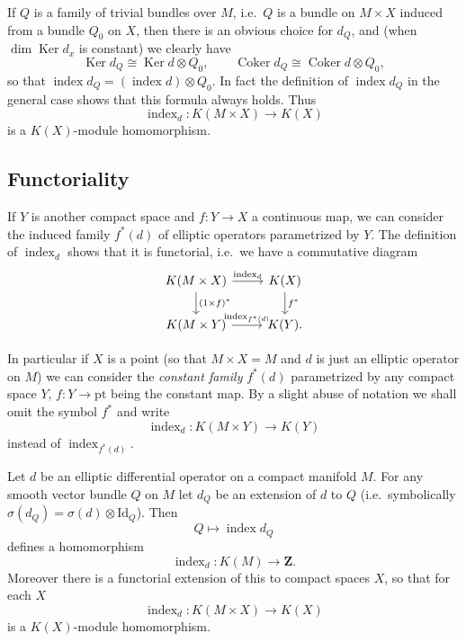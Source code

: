 \documentclass[12pt]{article}
\begin{document}
If $Q$ is a family of trivial bundles over $M$, i.e.\ $Q$ is a bundle on $M\times X$
induced from a bundle $Q_0$ on $X$, then there is an obvious choice for $d_Q$, and (when
$\dim\operatorname{Ker}d_x$ is constant) we clearly have
\[
\operatorname{Ker}d_Q \cong \operatorname{Ker}d\otimes Q_0, \qquad
\operatorname{Coker}d_Q \cong \operatorname{Coker}d\otimes Q_0,
\]
so that $\operatorname{index}d_Q = (\operatorname{index}d)\otimes Q_0$. In fact the
definition of $\operatorname{index}d_Q$ in the general case shows that this formula
always holds. Thus
\[
\operatorname{index}_d : K(M\times X)\longrightarrow K(X) \tag{2.1}
\]
is a $K(X)$-module homomorphism.

\subsection{Functoriality}

If $Y$ is another compact space and $f:Y\to X$ a continuous map, we can consider the
induced family $f^*(d)$ of elliptic operators parametrized by $Y$. The definition of
$\operatorname{index}_d$ shows that it is functorial, i.e.\ we have a commutative
diagram
\[
\begin{tikzcd}
K(M\times X) \arrow[r,"\operatorname{index}_d"] \arrow[d,"(1\times f)^*"] & K(X) \arrow[d,"f^*"] \\
K(M\times Y) \arrow[r,"\operatorname{index}_{f^*(d)}"] & K(Y).
\end{tikzcd}
\]

In particular if $X$ is a point (so that $M\times X = M$ and $d$ is just an elliptic
operator on $M$) we can consider the \emph{constant family} $f^*(d)$ parametrized by any
compact space $Y$, $f:Y\to\mathrm{pt}$ being the constant map. By a slight abuse of
notation we shall omit the symbol $f^*$ and write
\[
\operatorname{index}_d : K(M\times Y)\longrightarrow K(Y)
\]
instead of $\operatorname{index}_{f^*(d)}$.

\begin{proposition}\label{prop:index-elliptic-families}
Let $d$ be an elliptic differential operator on a compact manifold $M$. For any smooth
vector bundle $Q$ on $M$ let $d_Q$ be an extension of $d$ to $Q$ (i.e.\ symbolically
$\sigma(d_Q)=\sigma(d)\otimes\mathrm{Id}_Q$). Then
\[
Q\mapsto \operatorname{index}d_Q
\]
defines a homomorphism
\[
\operatorname{index}_d : K(M)\longrightarrow \mathbf Z.
\]
Moreover there is a functorial extension of this to compact spaces $X$, so that for each
$X$
\[
\operatorname{index}_d : K(M\times X)\longrightarrow K(X)
\]
is a $K(X)$-module homomorphism.
\end{proposition}
\end{document}
